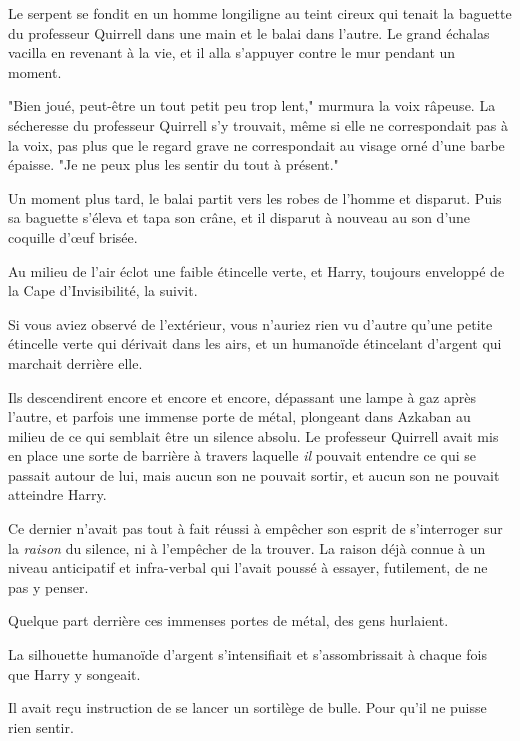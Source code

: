 Le serpent se fondit en un homme longiligne au teint cireux qui tenait la baguette du professeur Quirrell dans une main et le balai dans l'autre. Le grand échalas vacilla en revenant à la vie, et il alla s'appuyer contre le mur pendant un moment.

"Bien joué, peut-être un tout petit peu trop lent," murmura la voix râpeuse. La sécheresse du professeur Quirrell s'y trouvait, même si elle ne correspondait pas à la voix, pas plus que le regard grave ne correspondait au visage orné d'une barbe épaisse. "Je ne peux plus les sentir du tout à présent."

Un moment plus tard, le balai partit vers les robes de l'homme et disparut. Puis sa baguette s'éleva et tapa son crâne, et il disparut à nouveau au son d'une coquille d'œuf brisée.

Au milieu de l'air éclot une faible étincelle verte, et Harry, toujours enveloppé de la Cape d'Invisibilité, la suivit.

Si vous aviez observé de l'extérieur, vous n'auriez rien vu d'autre qu'une petite étincelle verte qui dérivait dans les airs, et un humanoïde étincelant d'argent qui marchait derrière elle.

\later

Ils descendirent encore et encore et encore, dépassant une lampe à gaz après l'autre, et parfois une immense porte de métal, plongeant dans Azkaban au milieu de ce qui semblait être un silence absolu. Le professeur Quirrell avait mis en place une sorte de barrière à travers laquelle \emph{il} pouvait entendre ce qui se passait autour de lui, mais aucun son ne pouvait sortir, et aucun son ne pouvait atteindre Harry.

Ce dernier n'avait pas tout à fait réussi à empêcher son esprit de s'interroger sur la \emph{raison} du silence, ni à l'empêcher de la trouver. La raison déjà connue à un niveau anticipatif et infra-verbal qui l'avait poussé à essayer, futilement, de ne pas y penser.

Quelque part derrière ces immenses portes de métal, des gens hurlaient.

La silhouette humanoïde d'argent s'intensifiait et s'assombrissait à chaque fois que Harry y songeait.

Il avait reçu instruction de se lancer un sortilège de bulle. Pour qu'il ne puisse rien sentir.

